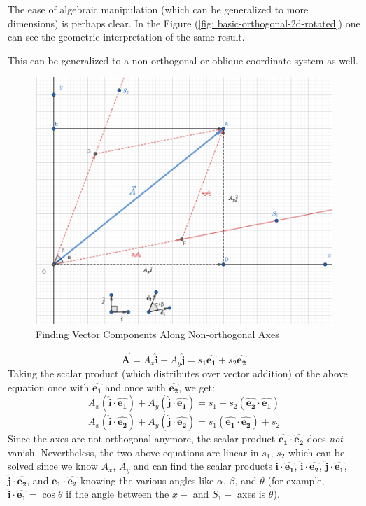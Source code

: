 \documentclass[12pt,a4paper]{book}
\newcommand{\vect}[1]{\pmb{\vec{#1}}}
\newcommand{\uvec}[1]{\pmb{\hat{#1}}}
\begin{document}
\begin{enumerate}
\begin{enumerate}
\begin{enumerate}
                        The ease of algebraic manipulation (which can be generalized to more dimensions) is perhaps clear. In the Figure (\ref{fig: basic-orthogonal-2d-rotated}) one can see the geometric interpretation of the same result.

                        This can be generalized to a non-orthogonal or oblique coordinate system as well.
                        \begin{figure}[h!]
                            \centering
                            \includegraphics[width=0.8\linewidth]{oblique-2d-system.png}
                            \caption{Finding Vector Components Along Non-orthogonal Axes}
                            \label{fig: oblique-2d-system}
                        \end{figure}

                        $$
                            \vect{A} = A_x\uvec{i} + A_y\uvec{j} = s_1{\uvec{e_1}} + s_2{\uvec{e_2}}
                        $$
                        Taking the scalar product (which distributes over vector addition) of the above equation once with $\uvec{e_1}$ and once with $\uvec{e_2}$, we get:
                        $$
                            A_x(\uvec{i}\cdot\uvec{e_1}) + A_y(\uvec{j}\cdot\uvec{e_1}) 
                            =
                            s_1 + s_2(\uvec{e_2}\cdot\uvec{e_1})
                        $$
                        $$
                            A_x(\uvec{i}\cdot\uvec{e_2}) + A_y(\uvec{j}\cdot\uvec{e_2}) 
                            =
                            s_1(\uvec{e_1}\cdot\uvec{e_2}) + s_2
                        $$
                        Since the axes are not orthogonal anymore, the scalar product $\uvec{e_1}\cdot\uvec{e_2}$ does \emph{not} vanish. Nevertheless, the two above equations are linear in $s_1$, $s_2$ which can be solved since we know $A_x$, $A_y$ and can find the scalar products $\uvec{i}\cdot\uvec{e_1}$, $\uvec{i}\cdot\uvec{e_2}$, $\uvec{j}\cdot\uvec{e_1}$, $\uvec{j}\cdot\uvec{e_2}$, and $\uvec{e_1}\cdot\uvec{e_2}$ knowing the various angles like $\alpha$, $\beta$, and $\theta$ (for example, $\uvec{i}\cdot\uvec{e_1} = \cos\theta$ if the angle between the $x-$ and $S_1-$ axes is $\theta$).


\end{enumerate}
\end{enumerate}
\end{enumerate}
\end{document}
